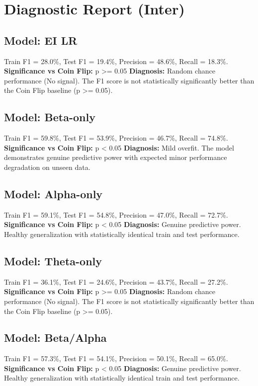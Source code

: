 \section*{Diagnostic Report (Inter)}
\subsection*{Model: EI LR}
Train F1 = 28.0\%, Test F1 = 19.4\%, Precision = 48.6\%, Recall = 18.3\%.
\newline
\textbf{Significance vs Coin Flip:} p >= 0.05
\newline
\textbf{Diagnosis:} Random chance performance (No signal). The F1 score is not statistically significantly better than the Coin Flip baseline (p >= 0.05).

\subsection*{Model: Beta-only}
Train F1 = 59.8\%, Test F1 = 53.9\%, Precision = 46.7\%, Recall = 74.8\%.
\newline
\textbf{Significance vs Coin Flip:} p < 0.05
\newline
\textbf{Diagnosis:} Mild overfit. The model demonstrates genuine predictive power with expected minor performance degradation on unseen data.

\subsection*{Model: Alpha-only}
Train F1 = 59.1\%, Test F1 = 54.8\%, Precision = 47.0\%, Recall = 72.7\%.
\newline
\textbf{Significance vs Coin Flip:} p < 0.05
\newline
\textbf{Diagnosis:} Genuine predictive power. Healthy generalization with statistically identical train and test performance.

\subsection*{Model: Theta-only}
Train F1 = 36.1\%, Test F1 = 24.6\%, Precision = 43.7\%, Recall = 27.2\%.
\newline
\textbf{Significance vs Coin Flip:} p >= 0.05
\newline
\textbf{Diagnosis:} Random chance performance (No signal). The F1 score is not statistically significantly better than the Coin Flip baseline (p >= 0.05).

\subsection*{Model: Beta/Alpha}
Train F1 = 57.3\%, Test F1 = 54.1\%, Precision = 50.1\%, Recall = 65.0\%.
\newline
\textbf{Significance vs Coin Flip:} p < 0.05
\newline
\textbf{Diagnosis:} Genuine predictive power. Healthy generalization with statistically identical train and test performance.

